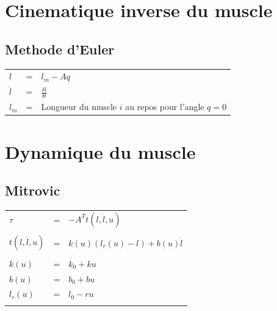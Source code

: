 \documentclass[pdftex,a4paper,11pt]{article}
\begin{document}
\section{Cinematique inverse du muscle}

\subsection{Methode d'Euler}

\begin{tabular}{lcl}
    $l$       & = & $l_m - A q $ \\
    $\dot{l}$ & = & $\frac{\delta l}{\delta t}$ \\
    $l_{m}$   & = & Longueur du muscle $i$ au repos pour l'angle $q = 0$ \\
\end{tabular}
    

\section{Dynamique du muscle}

\subsection{Mitrovic}

\begin{tabular}{lcl}
    $\tau$ & = & $-A^T t(l, \dot{l}, u)$ \\
    \\
    $t(l, \dot{l}, u)$        & = & $k(u) (l_r(u) - l) + b(u) \dot{l}$ \\
    \\
    $k(u)$    & = & $k_0 + k u$ \\
    $b(u)$    & = & $b_0 + b u$ \\
    $l_r(u)$  & = & $l_0 - r u$ \\
    \\
\end{tabular}
\end{document}
